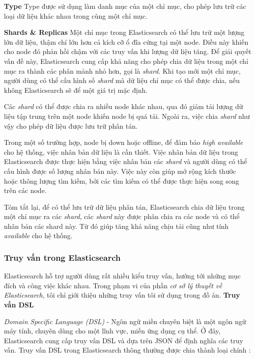 \textbf{Type} Type được sử dụng làm danh mục của một chỉ mục, cho phép lưu trữ các loại dữ liệu khác nhau trong cùng một chỉ mục.

\textbf{Shards \& Replicas}
Một chỉ mục trong Elasticsearch có thể lưu trữ một lượng lớn dữ liệu, thậm chí lớn hơn cả kích cỡ ổ đĩa cứng tại một node. Điều này khiến cho node đó phản hồi chậm với các truy vấn khi lượng dữ liệu tăng. Để giải quyết vấn đề này, Elasticsearch cung cấp khả năng cho phép chia dữ liệu trong một chỉ mục ra thành các phân mảnh nhỏ hơn, gọi là \textit{shard}. Khi tạo mới một chỉ mục, người dùng có thể cấu hình số \textit{shard} mà dữ liệu chỉ mục có thể được chia, nếu không Elasticsearch sẽ để một giá trị mặc định.

Các \textit{shard} có thể được chia ra nhiều node khác nhau, qua đó giảm tải lượng dữ liệu tập trung trên một node khiến node bị quá tải. Ngoài ra, việc chia \textit{shard} như vậy cho phép dữ liệu được lưu trữ phân tán.

Trong một số trường hợp, node bị down hoặc offline, để đảm bảo \textit{high available} cho hệ thống, việc nhân bản dữ liệu là cần thiết. Việc nhân bản dữ liệu trong Elasticsearch được thực hiện bằng việc nhân bản các \textit{shard} và người dùng có thể cấu hình được số lượng nhân bản này. Việc này còn giúp mở rộng kích thước hoặc thông lượng tìm kiếm, bởi các tìm kiếm có thể được thực hiện song song trên các node.

Tóm tắt lại, để có thể lưu trữ dữ liệu phân tán, Elasticsearch chia dữ liệu trong một chỉ mục ra các \textit{shard}, các \textit{shard} này được phân chia ra các node và có thể nhân bản các shard này. Từ đó giúp tăng khả năng chịu tải cũng như tính \textit{available} cho hệ thống.

\subsubsection{Truy vấn trong Elasticsearch}
Elasticsearch hỗ trợ người dùng rất nhiều kiểu truy vấn, hướng tới những mục đích và công việc khác nhau. Trong phạm vi của phần \textit{cơ sở lý thuyết về Elasticsearch}, tôi chỉ giới thiệu những truy vấn tôi sử dụng trong đồ án.
\vspace{0.2cm}
\newline
\textbf{Truy vấn DSL}

\textit{Domain Specific Language (DSL)} - Ngôn ngữ miền chuyên biệt là một ngôn ngữ máy tính, chuyên dùng cho một lĩnh vực, miền ứng dụng cụ thể. Ở đây, Elasticsearch cung cấp truy vấn DSL và dựa trên JSON để định nghĩa các truy vấn. Truy vấn DSL trong Elasticsearch thông thường được chia thành loại chính :

